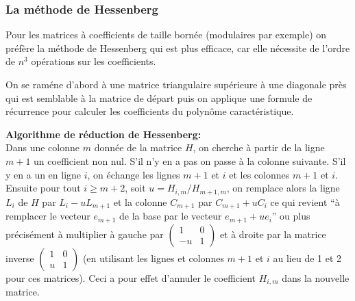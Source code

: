 \documentclass[a4paper,11pt]{article}
\begin{document}
\subsubsection{La m\'ethode de Hessenberg}
Pour les matrices \`a coefficients de taille born\'ee (modulaires par exemple)
on préfère la m\'ethode de Hessenberg qui est plus
efficace, car elle n\'ecessite de l'ordre de $n^3$ op\'erations sur
les coefficients.

On se ram\'ene d'abord \`a une matrice triangulaire supérieure à
une diagonale près qui est semblable \`a la
matrice de d\'epart puis on
applique une formule de r\'ecurrence pour calculer les coefficients
du polyn\^ome caract\'eristique.

{\bf Algorithme de réduction de Hessenberg:}\\
Dans une colonne $m$ donnée de la matrice $H$, 
on cherche à partir de la ligne
$m+1$ un coefficient non nul. S'il n'y en a pas on passe à la colonne
suivante. S'il y en a un en ligne $i$, on échange les lignes $m+1$
et $i$ et les colonnes $m+1$ et $i$. Ensuite pour tout $i\geq m+2$,
soit $u=H_{i,m}/H_{m+1,m}$, on remplace alors la ligne $L_i$ de $H$
par $L_i-uL_{m+1}$ et la colonne $C_{m+1}$ par $C_{m+1}+uC_i$
ce qui revient ``à remplacer le vecteur $e_{m+1}$ de la base
par le vecteur $e_{m+1}+ue_i$'' ou plus pr\'ecis\'ement
\`a multiplier \`a gauche par $\left(\begin{array}{cc}
1 & 0 \\ -u & 1\end{array}\right)$ et \`a droite par la matrice inverse
$\left(\begin{array}{cc}
1 & 0 \\ u & 1\end{array}\right)$ (en utilisant les lignes et colonnes
$m+1$ et $i$ au lieu de 1 et 2 pour ces matrices). 
Ceci a pour effet d'annuler le coefficient $H_{i,m}$
dans la nouvelle matrice.
\end{document}
